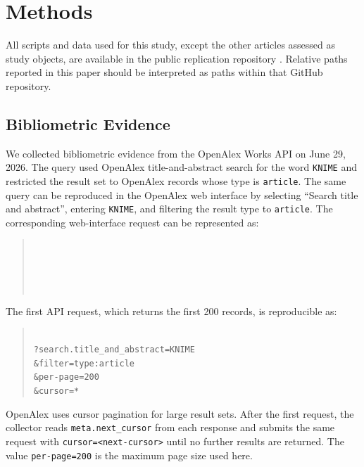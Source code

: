 \documentclass[runningheads]{llncs}
\begin{document}
\section{Methods}

All scripts and data used for this study, except the other articles assessed
as study objects, are available in the public replication repository
\cite{KaplanReproducibilityRisksArticle2026}. Relative paths reported in this
paper should be interpreted as paths within that GitHub repository.

\subsection{Bibliometric Evidence}

We collected bibliometric evidence from the OpenAlex Works API
\cite{Priem2022OpenAlex} on June 29, 2026. The query used OpenAlex
title-and-abstract search for the word \texttt{KNIME} and restricted the
result set to OpenAlex records whose type is \texttt{article}. The same query
can be reproduced in the
OpenAlex web interface by selecting ``Search title and abstract'', entering
\texttt{KNIME}, and filtering the result type to \texttt{article}. The
corresponding web-interface request can be represented as:

\begin{quote}
\\
\\
\\
\\
\end{quote}

The first API request, which returns the first 200 records, is reproducible as:

\begin{quote}
\\
\texttt{?search.title\_and\_abstract=KNIME}\\
\texttt{\&filter=type:article}\\
\texttt{\&per-page=200}\\
\texttt{\&cursor=*}
\end{quote}

OpenAlex uses cursor pagination for large result sets. After the first request,
the collector reads \texttt{meta.next\_cursor} from each response and submits
the same request with \texttt{cursor=<next-cursor>} until no further results
are returned. The value \texttt{per-page=200} is the maximum page size used
here.
\end{document}
